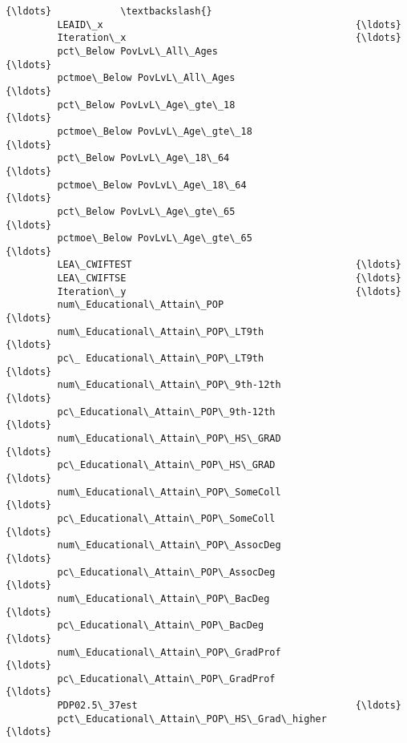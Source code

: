 \documentclass[11pt]{article}
\begin{document}
\begin{Verbatim}[commandchars=\\\{\}]
                                                            {\ldots}            \textbackslash{}
         LEAID\_x                                            {\ldots}             
         Iteration\_x                                        {\ldots}             
         pct\_Below PovLvL\_All\_Ages                          {\ldots}             
         pctmoe\_Below PovLvL\_All\_Ages                       {\ldots}             
         pct\_Below PovLvL\_Age\_gte\_18                        {\ldots}             
         pctmoe\_Below PovLvL\_Age\_gte\_18                     {\ldots}             
         pct\_Below PovLvL\_Age\_18\_64                         {\ldots}             
         pctmoe\_Below PovLvL\_Age\_18\_64                      {\ldots}             
         pct\_Below PovLvL\_Age\_gte\_65                        {\ldots}             
         pctmoe\_Below PovLvL\_Age\_gte\_65                     {\ldots}             
         LEA\_CWIFTEST                                       {\ldots}             
         LEA\_CWIFTSE                                        {\ldots}             
         Iteration\_y                                        {\ldots}             
         num\_Educational\_Attain\_POP                         {\ldots}             
         num\_Educational\_Attain\_POP\_LT9th                   {\ldots}             
         pc\_ Educational\_Attain\_POP\_LT9th                   {\ldots}             
         num\_Educational\_Attain\_POP\_9th-12th                {\ldots}             
         pc\_Educational\_Attain\_POP\_9th-12th                 {\ldots}             
         num\_Educational\_Attain\_POP\_HS\_GRAD                 {\ldots}             
         pc\_Educational\_Attain\_POP\_HS\_GRAD                  {\ldots}             
         num\_Educational\_Attain\_POP\_SomeColl                {\ldots}             
         pc\_Educational\_Attain\_POP\_SomeColl                 {\ldots}             
         num\_Educational\_Attain\_POP\_AssocDeg                {\ldots}             
         pc\_Educational\_Attain\_POP\_AssocDeg                 {\ldots}             
         num\_Educational\_Attain\_POP\_BacDeg                  {\ldots}             
         pc\_Educational\_Attain\_POP\_BacDeg                   {\ldots}             
         num\_Educational\_Attain\_POP\_GradProf                {\ldots}             
         pc\_Educational\_Attain\_POP\_GradProf                 {\ldots}             
         PDP02.5\_37est                                      {\ldots}             
         pct\_Educational\_Attain\_POP\_HS\_Grad\_higher          {\ldots}             

\end{Verbatim}
\end{document}
